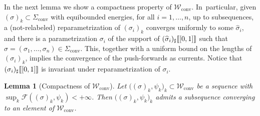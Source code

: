 \documentclass[JEP,XML,SOM,Unicode, NoFloatCountersInSection,published]{cedram}
\let\curves\Sigma
\newcommand\admclassconv{{\mathcal W_\mathrm{conv}}}
\newcommand\convexcurves{\curves_\mathrm{conv}}
\newcommand{\jump}[1]{\textup{\textlbrackdbl}{#1}\textup{\textrbrackdbl}}
\newtheorem{lemma}[theorem]{Lemma}
\theoremstyle{definition}
\begin{document}
In the next lemma we show a compactness property of $\admclassconv$. In~particular, given $(\sigma)_k\subset\convexcurves$ with equibounded energies, for all $i=1,\dots,n$, up to subsequences, a (not-relabeled) reparametrization of $(\sigma_i)_k$ converges uniformly to some $\widehat\sigma_i$, and there is a parametrization $\sigma_i$ of the support of $(\widehat \sigma_i)_\sharp\jump{[0,1]}$ such that $\sigma=(\sigma_1,\dots,\sigma_n)\in\convexcurves$. This,
together with a uniform bound on the lengths of $(\sigma_i)_k$, implies the convergence of the push-forwards as currents. Notice that $(\sigma_i)_\sharp\jump{[0,1]}$ is invariant under reparametrization of $\sigma_i$.

\begin{lemma}[Compactness of $\admclassconv$]\label{lem:compactness}
Let
$\big((\sigma)_{k},\psi_k\big)_k
\subset\admclassconv$ be a sequence with\\ $\sup_k\mathcal F((\sigma)_k,\psi_k)<+\infty$. Then
$\big((\sigma)_{k},\psi_k\big)_k$ admits
a subsequence converging to an element of $\admclassconv$.
\end{lemma}
\end{document}
